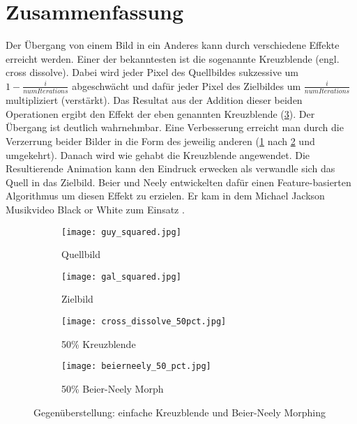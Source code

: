 \section*{Zusammenfassung}

Der Übergang von einem Bild in ein Anderes kann durch verschiedene
Effekte erreicht werden. Einer der bekanntesten ist die sogenannte
Kreuzblende (engl. cross dissolve). Dabei wird jeder Pixel des Quellbildes
sukzessive um $1-\frac{i}{numIterations}$ abgeschwächt und dafür jeder Pixel
des Zielbildes um $\frac{i}{numIterations}$ multipliziert (verstärkt). 
Das Resultat aus der Addition dieser beiden Operationen ergibt den
Effekt der eben genannten Kreuzblende (\ref{fig:dissolve}). Der Übergang
ist deutlich wahrnehmbar. Eine Verbesserung erreicht man durch die Verzerrung
beider Bilder in die Form des jeweilig anderen (\ref{fig:source} nach \ref{fig:dest} und umgekehrt).
Danach wird wie gehabt die Kreuzblende angewendet.
Die Resultierende Animation
kann den Eindruck erwecken als verwandle sich das Quell in das Zielbild.
Beier und Neely \cite{beierneely} entwickelten dafür einen Feature-basierten 
Algorithmus um diesen Effekt zu erzielen. Er kam in dem Michael Jackson Musikvideo
Black or White zum Einsatz \cite{cartoonbrew}.



\begin{figure}
	
	\centering
	\begin{subfigure}{0.4\textwidth}
		\centering
		\texttt{[image: guy\_squared.jpg]}
		\caption{Quellbild}
		\label{fig:source}
	\end{subfigure}
	\hfill
	\begin{subfigure}{0.4\textwidth}
		\centering
		\texttt{[image: gal\_squared.jpg]}
		\caption{Zielbild}
		\label{fig:dest}
	\end{subfigure}
	
	\centering
	\begin{subfigure}{0.4\textwidth}
		\centering
		\texttt{[image: cross\_dissolve\_50pct.jpg]}
		\caption{50\% Kreuzblende}
		\label{fig:dissolve}
	\end{subfigure}
	\hfill
	\begin{subfigure}{0.4\textwidth}
		\centering
		\texttt{[image: beierneely\_50\_pct.jpg]}
		\caption{50\% Beier-Neely Morph}
		\label{fig:morph}
	\end{subfigure}
	\caption{Gegenüberstellung: einfache Kreuzblende und Beier-Neely Morphing}
	\label{fig:side-by-side}
	
\end{figure}

